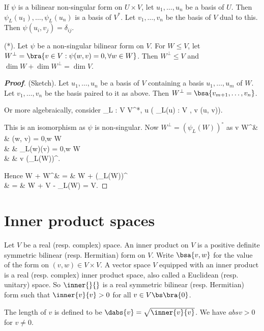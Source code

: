 If $\psi$ is a bilinear non-singular form on $U \times V$, let $u_1, \dots, u_n$ be a basis of $U$. Then $\psi_L(u_1), \dots, \psi_L(u_n)$ is a basis of $V^*$. Let $v_1, \dots, v_n$ be the basis of $V$ dual to this. Then $\psi(u_i, v_j) = \delta_{ij}$.

\begin{lemma}
(*). Let $\psi$ be a non-singular bilinear form on $V$. For $W \leq V$, let $W^\perp = \bra{v \in V : \psi (w, v) = 0 ,\forall w \in W}$. Then $W^\perp\leq V$ and $\dim W + \dim W^\perp = \dim V$.
\end{lemma}

\begin{proof}[\bf Proof]
(Sketch). Let $u_1, \dots, u_n$ be a basis of $V$ containing a basis $u_1, \dots, u_m$ of $W$. Let $v_1, \dots, v_n$ be the basis paired to it as above. Then $W^\perp = \bsa{v_{m+1}, \dots, v_n}$.

Or more algebraically, consider
\be
\psi_L : V \to V^*, u \mapsto ( \psi_L(u) : V \to\F, v \mapsto \psi(u, v)).
\ee

This is an isomorphism as $\psi$ is non-singular. Now $W^\perp = (\psi_L(W))^\circ$ as 
\beast
v \in W^\perp & \lra & \psi(w, v) = 0,\forall w \in W\\
& \lra & \psi_L(w)(v) = 0,\forall w \in W\\
& \lra & v \in (\psi_L(W))^\circ.
\eeast

Hence
\beast
\dim W + \dim W^\perp & = & \dim W + \dim(\psi_L(W))^\circ \\
& = & \dim W + \dim V - \dim \psi_L(W) = \dim V.
\eeast
\end{proof}


\section{Inner product spaces}

\begin{definition}
Let $V$ be a real (resp. complex) space. An inner product on $V$ is a positive definite symmetric bilinear (resp. Hermitian) form on $V$. Write $\bsa{v,w}$ for the value of the form on $(v,w) \in V \times V$. A vector space $V$ equipped with an inner product is a real (resp. complex) inner product space, also called a Euclidean (resp. unitary) space. So $\inner{}{}$ is a real symmetric bilinear (resp. Hermitian) form such that $\inner{v}{v} > 0$ for all $v \in V \bs \bra{0}$.
\end{definition}

\begin{definition}
The length of $v$ is defined to be $\dabs{v} =\sqrt{\inner{v}{v}}$. We have $abs{v} > 0$ for $v \neq 0$.
\end{definition}

